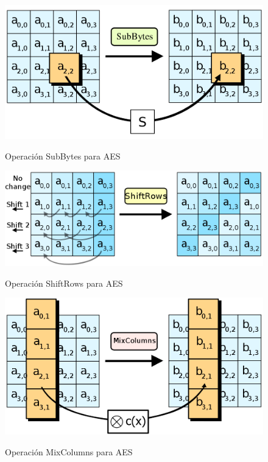  \begin{figure}[ht]
   \centering
   \includegraphics[scale=0.25]{Figures/SubBytes}
   \decoRule
   \caption[SubBytes (AES)]{Operación SubBytes para AES} \emph{\parencite{Reference27}}
   \label{fig:SubBytes}
 \end{figure}

 \begin{figure}[ht]
   \centering
   \includegraphics[scale=0.25]{Figures/ShiftRows}
   \decoRule
   \caption[ShiftRows (AES)]{Operación ShiftRows para AES} \emph{\parencite{Reference28}}
   \label{fig:ShiftRows}
 \end{figure}

 \begin{figure}[ht]
   \centering
   \includegraphics[scale=0.25]{Figures/MixColumns}
   \decoRule
   \caption[MixColumns (AES)]{Operación MixColumns para AES} \emph{\parencite{Reference29}}
   \label{fig:MixColumns}
 \end{figure}

